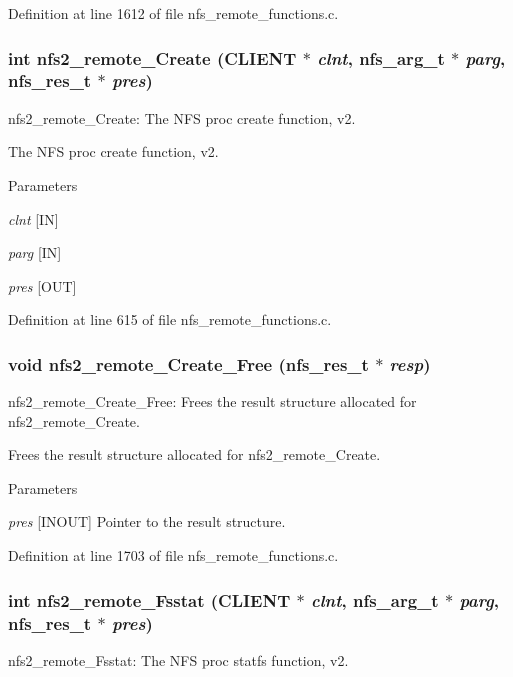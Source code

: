 Definition at line 1612 of file nfs\_\-remote\_\-functions.c.
\subsubsection[{nfs2\_\-remote\_\-Create}]{\setlength{\rightskip}{0pt plus 5cm}int nfs2\_\-remote\_\-Create (CLIENT $\ast$ {\em clnt}, \/  nfs\_\-arg\_\-t $\ast$ {\em parg}, \/  nfs\_\-res\_\-t $\ast$ {\em pres})}\label{group__NFSprocs_ga799f2a241ac2d82c0c338126c0e66561}
nfs2\_\-remote\_\-Create: The NFS proc create function, v2.

The NFS proc create function, v2.


\begin{DoxyParams}{Parameters}
\item[{\em clnt}][IN] \item[{\em parg}][IN] \item[{\em pres}][OUT] \end{DoxyParams}


Definition at line 615 of file nfs\_\-remote\_\-functions.c.
\subsubsection[{nfs2\_\-remote\_\-Create\_\-Free}]{\setlength{\rightskip}{0pt plus 5cm}void nfs2\_\-remote\_\-Create\_\-Free (nfs\_\-res\_\-t $\ast$ {\em resp})}\label{group__NFSprocs_gac7be9ac59838a3d6c5decadfdd55e88c}
nfs2\_\-remote\_\-Create\_\-Free: Frees the result structure allocated for nfs2\_\-remote\_\-Create.

Frees the result structure allocated for nfs2\_\-remote\_\-Create.


\begin{DoxyParams}{Parameters}
\item[{\em pres}][INOUT] Pointer to the result structure. \end{DoxyParams}


Definition at line 1703 of file nfs\_\-remote\_\-functions.c.
\subsubsection[{nfs2\_\-remote\_\-Fsstat}]{\setlength{\rightskip}{0pt plus 5cm}int nfs2\_\-remote\_\-Fsstat (CLIENT $\ast$ {\em clnt}, \/  nfs\_\-arg\_\-t $\ast$ {\em parg}, \/  nfs\_\-res\_\-t $\ast$ {\em pres})}\label{group__NFSprocs_gaa34326e310c259cdff88acf9d4803b23}
nfs2\_\-remote\_\-Fsstat: The NFS proc statfs function, v2.

